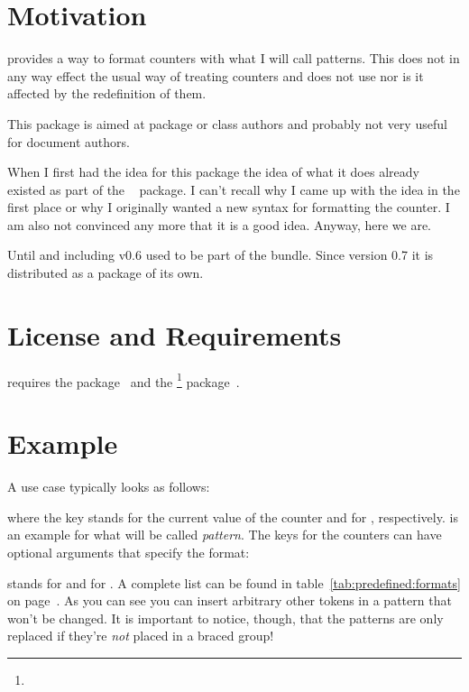 \documentclass[load-preamble+]{cnltx-doc}
\begin{document}
\section{Motivation}
\cntformats{} provides a way to format counters with what I will call
patterns.  This does not in any way effect the usual \LaTeXe{} way of treating
counters and does not use  nor is it affected by the
redefinition of them.

This package is aimed at package or class authors and probably not very useful
for document authors.

When I first had the idea for this package the idea of what it does already
existed as part of the ~\cite{bnd:exsheets} package.  I can't
recall why I came up with the idea in the first place or why I originally
wanted a new syntax for formatting the  counter.  I am also not
convinced any more that it is a good idea.  Anyway, here we are.

Until and including v0.6 \cntformats{} used to be part of
the  bundle.  Since version 0.7 it is distributed as a package
of its own.

\section{License and Requirements}\label{sec:license}
\license

\cntformats{} requires the  package~\cite{pkg:etoolbox}
and the \footnote{} package~\cite{bnd:cnltx}.

\section{Example}
A use case typically looks as follows:
\begin{example}
\end{example}
where the key  stands for the current value of the 
counter and  for , respectively.  is
an example for what will be called \emph{pattern}. The keys for the counters
can have optional arguments that specify the format:
\begin{example}
\end{example}
 stands for  and  for .  A complete list
can be found in table~\ref{tab:predefined:formats} on
page~\pageref{tab:predefined:formats}.  As you can see you can insert
arbitrary other tokens in a pattern that won't be changed.  It is important to
notice, though, that the patterns are only replaced if they're \emph{not}
placed in a braced group!
\end{document}
